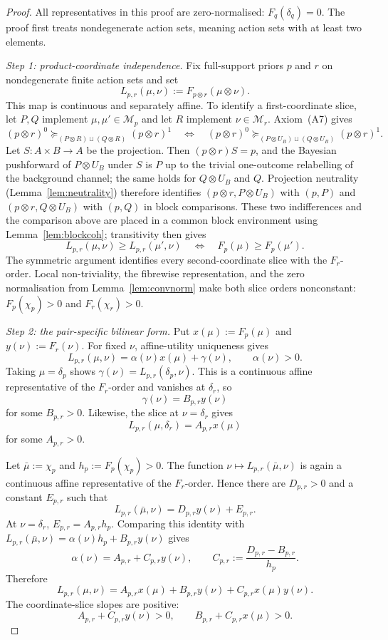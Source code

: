 \documentclass[11pt,a4paper]{article}
\theoremstyle{definition}
\newcommand{\1}{\mathbf 1}
\begin{document}
\begin{proof}
All representatives in this proof are zero-normalised: $F_q(\delta_q)=0$.  The proof first treats nondegenerate action
sets, meaning action sets with at least two elements.

\emph{Step 1: product-coordinate independence.}
Fix full-support priors $p$ and $r$ on nondegenerate finite action sets and set
\[
L_{p,r}(\mu,\nu):=F_{p\otimes r}(\mu\otimes\nu).
\]
This map is continuous and separately affine.  To identify a first-coordinate slice, let $P,Q$ implement
$\mu,\mu'\in\mathcal M_p$ and let $R$ implement $\nu\in\mathcal M_r$.  Axiom~\textup{(A7)} gives
\[
(p\otimes r)^0\succeq_{(P\otimes R)\sqcup(Q\otimes R)}(p\otimes r)^1
\quad\Longleftrightarrow\quad
(p\otimes r)^0\succeq_{(P\otimes U_B)\sqcup(Q\otimes U_B)}(p\otimes r)^1.
\]
Let $S:A\times B\to A$ be the projection.  Then $(p\otimes r)S=p$, and the Bayesian pushforward of
$P\otimes U_B$ under $S$ is $P$ up to the trivial one-outcome relabelling of the background channel; the same holds for
$Q\otimes U_B$ and $Q$.  Projection neutrality (Lemma~\ref{lem:neutrality}) therefore identifies
$(p\otimes r,P\otimes U_B)$ with $(p,P)$ and $(p\otimes r,Q\otimes U_B)$ with $(p,Q)$ in block comparisons.  These two
indifferences and the comparison above are placed in a common block environment using Lemma~\ref{lem:blockcoh};
transitivity then gives
\[
L_{p,r}(\mu,\nu)\ge L_{p,r}(\mu',\nu)
\quad\Longleftrightarrow\quad
F_p(\mu)\ge F_p(\mu').
\]
The symmetric argument identifies every second-coordinate slice with the $F_r$-order.  Local non-triviality, the
fibrewise representation, and the zero normalisation from Lemma~\ref{lem:convnorm} make both slice orders nonconstant:
$F_p(\chi_p)>0$ and $F_r(\chi_r)>0$.

\emph{Step 2: the pair-specific bilinear form.}
Put $x(\mu):=F_p(\mu)$ and $y(\nu):=F_r(\nu)$.  For fixed $\nu$, affine-utility uniqueness gives
\[
L_{p,r}(\mu,\nu)=\alpha(\nu)x(\mu)+\gamma(\nu),
\qquad \alpha(\nu)>0.
\]
Taking $\mu=\delta_p$ shows $\gamma(\nu)=L_{p,r}(\delta_p,\nu)$.  This is a continuous affine representative of the
$F_r$-order and vanishes at $\delta_r$, so
\[
\gamma(\nu)=B_{p,r}y(\nu)
\]
for some $B_{p,r}>0$.  Likewise, the slice at $\nu=\delta_r$ gives
\[
L_{p,r}(\mu,\delta_r)=A_{p,r}x(\mu)
\]
for some $A_{p,r}>0$.

Let $\bar\mu:=\chi_p$ and $h_p:=F_p(\chi_p)>0$.  The function
$\nu\mapsto L_{p,r}(\bar\mu,\nu)$ is again a continuous affine representative of the $F_r$-order.  Hence there are
$D_{p,r}>0$ and a constant $E_{p,r}$ such that
\[
L_{p,r}(\bar\mu,\nu)=D_{p,r}y(\nu)+E_{p,r}.
\]
At $\nu=\delta_r$, $E_{p,r}=A_{p,r}h_p$.  Comparing this identity with
$L_{p,r}(\bar\mu,\nu)=\alpha(\nu)h_p+B_{p,r}y(\nu)$ gives
\[
\alpha(\nu)=A_{p,r}+C_{p,r}y(\nu),
\qquad
C_{p,r}:=\frac{D_{p,r}-B_{p,r}}{h_p}.
\]
Therefore
\begin{equation}
L_{p,r}(\mu,\nu)
=A_{p,r}x(\mu)+B_{p,r}y(\nu)+C_{p,r}x(\mu)y(\nu).
\tag{BIL}\label{eq:pairbilinear}
\end{equation}
The coordinate-slice slopes are positive:
\[
A_{p,r}+C_{p,r}y(\nu)>0,
\qquad
B_{p,r}+C_{p,r}x(\mu)>0.
\]


\end{proof}
\end{document}
